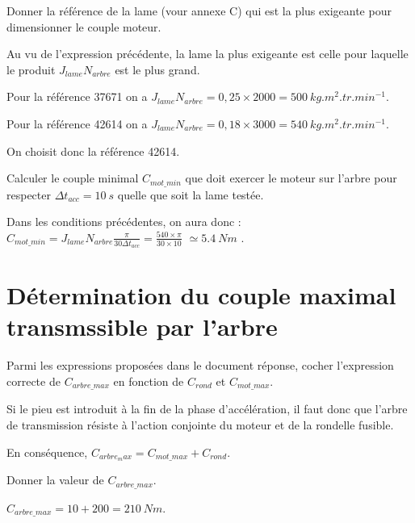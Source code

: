 \documentclass[11pt]{article}
\begin{document}
\UPSTIquestion Donner la référence de la lame (vour annexe C) qui est la plus exigeante pour dimensionner le couple moteur. 

\begin{UPSTIcorrige}
Au vu de l'expression précédente, la lame la plus exigeante est celle pour laquelle le produit 
$J_{lame} N_{arbre}$ est le plus grand. 

Pour la référence 37671 on a $J_{lame} N_{arbre} = 0,25 \times 2000 = \SI{500}{kg.m^2.tr.min^{-1}}$.

Pour la référence 42614 on a $J_{lame} N_{arbre} = 0,18 \times 3000 = \SI{540}{kg.m^2.tr.min^{-1}}$.

On choisit donc la référence 42614.
\end{UPSTIcorrige}


\UPSTIquestion Calculer le couple minimal $C_{mot\_min}$ que doit exercer le moteur sur l'arbre pour respecter $\Delta t _{acc}  = \SI{10}{s}$ quelle que soit la lame testée. 

\begin{UPSTIcorrige}
Dans les conditions précédentes, on aura donc 
:$  C_{mot\_min} = J_{lame} N_{arbre} \frac{\pi}{30 \Delta t_{acc}} =  \frac{540 \times \pi}{30 \times 10}$
$ \simeq \SI{5,4}{Nm}$ .

\end{UPSTIcorrige}


\section{Détermination du couple maximal transmssible par l'arbre}

\UPSTIquestion* Parmi les expressions proposées dans le document réponse, cocher l'expression correcte de $C_{arbre\_max}$ en fonction de $C_{rond}$ et $C_{mot\_max}$.
\begin{UPSTIcorrige}
Si le pieu est introduit à la fin de la phase d'accélération, il faut donc que l'arbre de transmission résiste à l'action conjointe du moteur et de la rondelle fusible. 

En conséquence, $C_{arbre_max} = C_{mot\_max}+ C_{rond}$.
\end{UPSTIcorrige}

\UPSTIquestion Donner la valeur de $C_{arbre\_max}$.

\begin{UPSTIcorrige}
$C_{arbre\_max} = 10+ 200 = \SI{210}{Nm}$.
\end{UPSTIcorrige}


\end{document}
